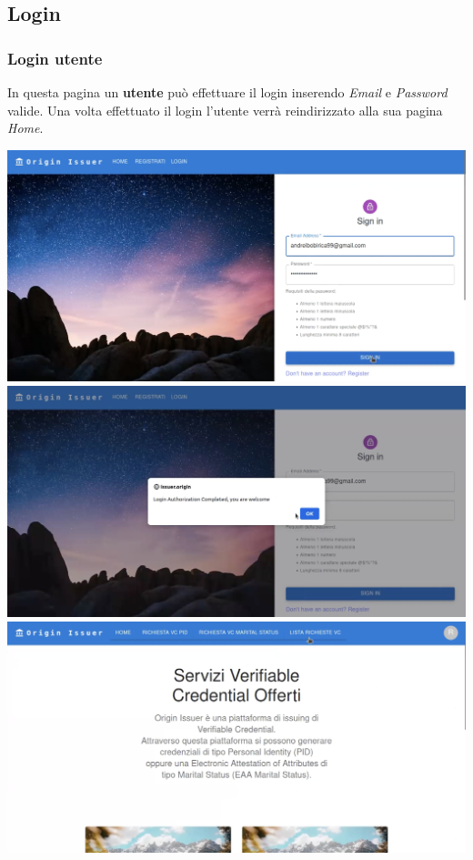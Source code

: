 \subsection{Login}
\subsubsection{Login utente}
In questa pagina un \textbf{utente} può effettuare il login inserendo \textit{Email} e \textit{Password} valide. Una volta effettuato il login l'utente verrà reindirizzato alla sua pagina \textit{Home}.
\begin{center}
\includegraphics[scale = 0.2]{./res/img/issuer/login/user/login1.png}
\includegraphics[scale = 0.2]{./res/img/issuer/login/user/login2.png}
\includegraphics[scale = 0.2]{./res/img/issuer/login/user/login3.png}    
\end{center}


